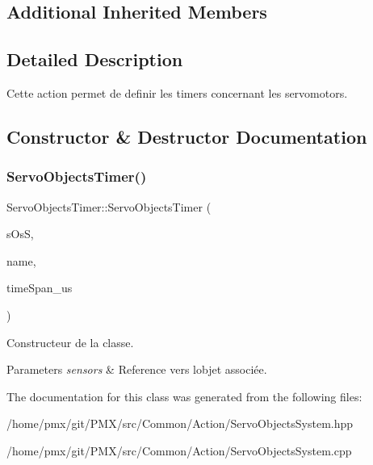 \subsection*{Additional Inherited Members}


\subsection{Detailed Description}
Cette action permet de definir les timers concernant les servomotors. 

\subsection{Constructor \& Destructor Documentation}
\mbox{\label{classServoObjectsTimer_a63cc29effd9e265d70097c1eed5ca9a9}} 
\subsubsection{\texorpdfstring{Servo\+Objects\+Timer()}{ServoObjectsTimer()}}
{\footnotesize\ttfamily Servo\+Objects\+Timer\+::\+Servo\+Objects\+Timer (\begin{DoxyParamCaption}\item[{\hyperlink{classServoObjectsSystem}{Servo\+Objects\+System} \&}]{s\+OsS,  }\item[{std\+::string}]{name,  }\item[{uint}]{time\+Span\+\_\+us }\end{DoxyParamCaption})}



Constructeur de la classe. 


\begin{DoxyParams}{Parameters}
{\em sensors} & Reference vers l\textquotesingle{}objet associée. \\
\hline
\end{DoxyParams}


The documentation for this class was generated from the following files\+:\begin{DoxyCompactItemize}
\item 
/home/pmx/git/\+P\+M\+X/src/\+Common/\+Action/Servo\+Objects\+System.\+hpp\item 
/home/pmx/git/\+P\+M\+X/src/\+Common/\+Action/Servo\+Objects\+System.\+cpp\end{DoxyCompactItemize}
